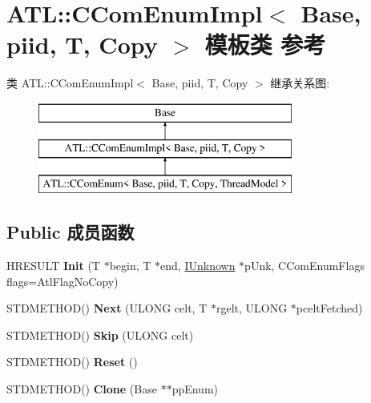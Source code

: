 \hypertarget{class_a_t_l_1_1_c_com_enum_impl}{}\section{A\+TL\+:\+:C\+Com\+Enum\+Impl$<$ Base, piid, T, Copy $>$ 模板类 参考}
\label{class_a_t_l_1_1_c_com_enum_impl}
类 A\+TL\+:\+:C\+Com\+Enum\+Impl$<$ Base, piid, T, Copy $>$ 继承关系图\+:\begin{figure}[H]
\begin{center}
\leavevmode
\includegraphics[height=3.000000cm]{class_a_t_l_1_1_c_com_enum_impl}
\end{center}
\end{figure}
\subsection*{Public 成员函数}
\begin{DoxyCompactItemize}
\item 
\mbox{\label{class_a_t_l_1_1_c_com_enum_impl_ac7d7c9b089a44f83d26f1f8b4a559178}} 
H\+R\+E\+S\+U\+LT {\bfseries Init} (T $\ast$begin, T $\ast$end, \hyperlink{interface_i_unknown}{I\+Unknown} $\ast$p\+Unk, C\+Com\+Enum\+Flags flags=Atl\+Flag\+No\+Copy)
\item 
\mbox{\label{class_a_t_l_1_1_c_com_enum_impl_a9ef18430b31c4e883fa707d0b09254ac}} 
S\+T\+D\+M\+E\+T\+H\+OD() {\bfseries Next} (U\+L\+O\+NG celt, T $\ast$rgelt, U\+L\+O\+NG $\ast$pcelt\+Fetched)
\item 
\mbox{\label{class_a_t_l_1_1_c_com_enum_impl_a1068844776cd0f108cf50a3629e1b70f}} 
S\+T\+D\+M\+E\+T\+H\+OD() {\bfseries Skip} (U\+L\+O\+NG celt)
\item 
\mbox{\label{class_a_t_l_1_1_c_com_enum_impl_acd87a31971d5893157390a08c9d6c4f3}} 
S\+T\+D\+M\+E\+T\+H\+OD() {\bfseries Reset} ()
\item 
\mbox{\label{class_a_t_l_1_1_c_com_enum_impl_a651f8d673348e578af9b340d0bdbf78b}} 
S\+T\+D\+M\+E\+T\+H\+OD() {\bfseries Clone} (Base $\ast$$\ast$pp\+Enum)
\end{DoxyCompactItemize}
